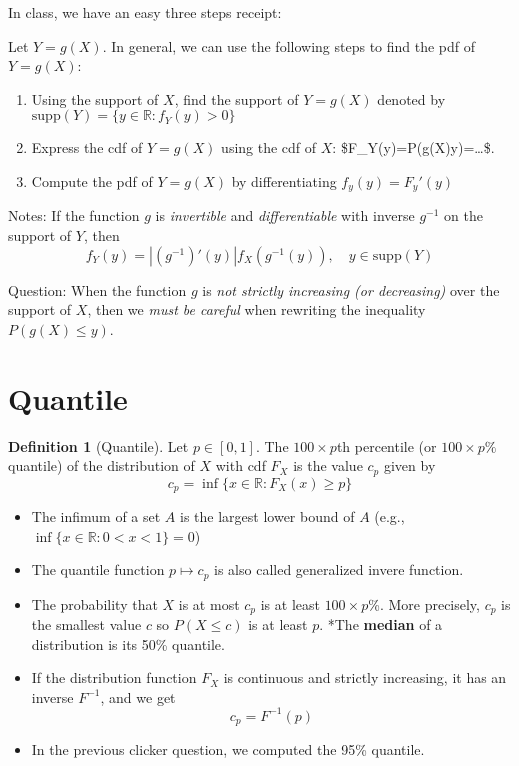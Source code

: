 \documentclass[
]{book}
\providecommand{\tightlist}{%
  \setlength{\itemsep}{0pt}\setlength{\parskip}{0pt}}
\theoremstyle{definition}
\newtheorem{definition}{Definition}[chapter]
\theoremstyle{definition}
\theoremstyle{definition}
\theoremstyle{definition}
\theoremstyle{remark}
\begin{document}
In class, we have an easy three steps receipt:

Let \(Y=g(X)\). In general, we can use the following steps to find the pdf of \(Y=g(X)\):

\begin{enumerate}
\def\labelenumi{\arabic{enumi}.}
\item
  Using the support of \(X\), find the support of \(Y=g(X)\) denoted by \(\text{supp}(Y)=\{y\in\mathbb{R}:f_Y(y)>0\}\)
\item
  Express the cdf of \(Y=g(X)\) using the cdf of \(X\): \$F\_Y(y)=P(g(X)\leq y)=\dots \$.
\item
  Compute the pdf of \(Y=g(X)\) by differentiating \(f_y(y)=F_y'(y)\)
\end{enumerate}

Notes: If the function \(g\) is \emph{invertible} and \emph{differentiable} with inverse \(g^{-1}\) on the support of \(Y\), then
\[ f_Y(y)= |(g^{-1})'(y)| f_X(g^{-1}(y)),\quad y\in\text{supp}(Y)\]

Question:
When the function \(g\) is \emph{not strictly increasing (or decreasing)} over the support of \(X\), then we \emph{must be careful} when rewriting the inequality \(P(g(X)\leq y)\).

\section{Quantile}\label{quantile}

\begin{definition}[Quantile]
Let \(p\in[0,1]\). The \(100\times p\)th percentile (or \(100\times p\%\) quantile) of the distribution of \(X\) with cdf \(F_X\) is the value \(c_p\) given by
\[ c_p = \inf\{x\in\mathbb{R}: F_X(x) \geq p \}\]
\end{definition}

\begin{itemize}
\tightlist
\item
  The infimum of a set \(A\) is the largest lower bound of \(A\) (e.g., \(\inf\{x\in\mathbb{R}: 0<x<1\}=0\))
\item
  The quantile function \(p\mapsto c_p\) is also called generalized invere function.
\item
  The probability that \(X\) is at most \(c_p\) is at least \(100\times p\)\%. More precisely, \(c_p\) is the smallest value \(c\) so \(P(X\leq c)\) is at least \(p\).
  *The \textbf{median} of a distribution is its 50\% quantile. \pause
\item
  If the distribution function \(F_X\) is continuous and strictly increasing, it has an inverse \(F^{-1}\), and we get
  \[ c_p = F^{-1}(p)\]
\item
  In the previous clicker question, we computed the 95\% quantile.
\end{itemize}
\end{document}
